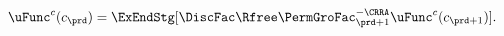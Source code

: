   \begin{equation}\begin{gathered}\begin{aligned}
        \uFunc^{c}(c_{\prd})  & = \ExEndStg[\DiscFac\Rfree \PermGroFac_{\prd+1}^{-\CRRA}\uFunc^{c}(c_{\prd+1})] \label{eq:cEuler}.
      \end{aligned}\end{gathered}\end{equation}
